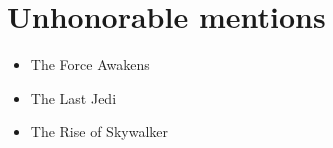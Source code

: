 \section{Unhonorable mentions}
\begin{itemize}
  \item The Force Awakens
  \item The Last Jedi
  \item The Rise of Skywalker
\end{itemize}
